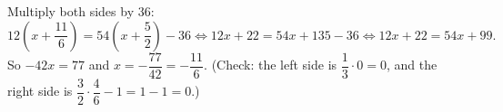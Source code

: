 Multiply both sides by $36$:
\[12\left(x+\dfrac{11}{6}\right)=54\left(x+\dfrac52\right)-36\iff12x+22=54x+135-36\iff12x+22=54x+99.\]
So $-42x=77$ and $x=-\dfrac{77}{42}=\boxed{-\dfrac{11}{6}}$. (Check: the left side is $\dfrac13\cdot0=0$, and the right side is $\dfrac32\cdot\dfrac46-1=1-1=0$.)
